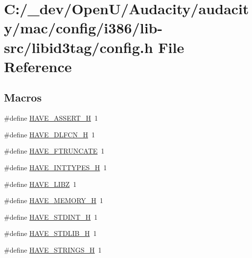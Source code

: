 \hypertarget{mac_2config_2i386_2lib-src_2libid3tag_2config_8h}{}\section{C\+:/\+\_\+dev/\+Open\+U/\+Audacity/audacity/mac/config/i386/lib-\/src/libid3tag/config.h File Reference}
\label{mac_2config_2i386_2lib-src_2libid3tag_2config_8h}
\subsection*{Macros}
\begin{DoxyCompactItemize}
\item 
\#define \hyperlink{mac_2config_2i386_2lib-src_2libid3tag_2config_8h_ad0eabe2e5407bc73450eb15b657983cd}{H\+A\+V\+E\+\_\+\+A\+S\+S\+E\+R\+T\+\_\+H}~1
\item 
\#define \hyperlink{mac_2config_2i386_2lib-src_2libid3tag_2config_8h_a0ee1617ff2f6885ef384a3dd46f9b9d7}{H\+A\+V\+E\+\_\+\+D\+L\+F\+C\+N\+\_\+H}~1
\item 
\#define \hyperlink{mac_2config_2i386_2lib-src_2libid3tag_2config_8h_a09e31dd5fbbe2ad51c5970a2d4819542}{H\+A\+V\+E\+\_\+\+F\+T\+R\+U\+N\+C\+A\+TE}~1
\item 
\#define \hyperlink{mac_2config_2i386_2lib-src_2libid3tag_2config_8h_ab90a030ff2790ebdc176660a6dd2a478}{H\+A\+V\+E\+\_\+\+I\+N\+T\+T\+Y\+P\+E\+S\+\_\+H}~1
\item 
\#define \hyperlink{mac_2config_2i386_2lib-src_2libid3tag_2config_8h_ab52774670674c949e48837976b331e33}{H\+A\+V\+E\+\_\+\+L\+I\+BZ}~1
\item 
\#define \hyperlink{mac_2config_2i386_2lib-src_2libid3tag_2config_8h_ae93a78f9d076138897af441c9f86f285}{H\+A\+V\+E\+\_\+\+M\+E\+M\+O\+R\+Y\+\_\+H}~1
\item 
\#define \hyperlink{mac_2config_2i386_2lib-src_2libid3tag_2config_8h_ab6cd6d1c63c1e26ea2d4537b77148354}{H\+A\+V\+E\+\_\+\+S\+T\+D\+I\+N\+T\+\_\+H}~1
\item 
\#define \hyperlink{mac_2config_2i386_2lib-src_2libid3tag_2config_8h_a9e0e434ec1a6ddbd97db12b5a32905e0}{H\+A\+V\+E\+\_\+\+S\+T\+D\+L\+I\+B\+\_\+H}~1
\item 
\#define \hyperlink{mac_2config_2i386_2lib-src_2libid3tag_2config_8h_a405d10d46190bcb0320524c54eafc850}{H\+A\+V\+E\+\_\+\+S\+T\+R\+I\+N\+G\+S\+\_\+H}~1
\item 

\end{DoxyCompactItemize}
